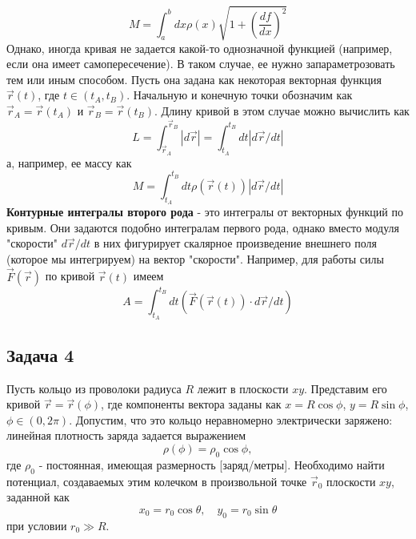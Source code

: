 \documentclass[a4paper,12pt]{article}
\begin{document}
\[
M	=\int_{a}^{b}dx\rho(x)\sqrt{1+\left(\frac{df}{dx}\right)^{2}}
\]
\bigskip
\noindent
Однако, иногда кривая не задается какой-то однозначной функцией (например, если она имеет самопересечение). В таком случае, ее нужно запараметрозовать тем или иным способом. Пусть она задана как некоторая векторная функция $\vec{r}(t)$,	где $t\in(t_{A},t_{B})$. Начальную и конечную точки обозначим как $\vec{r}_{A}=\vec{r}(t_{A})$ и $\vec{r}_{B}=\vec{r}(t_{B})$. Длину кривой в этом случае можно вычислить как
\[
L	=\int_{\vec{r}_{A}}^{\vec{r}_{B}}|d\vec{r}|=\int_{t_{A}}^{t_{B}}dt|d\vec{r}/dt|
\]
а, например, ее массу как
\[
M	=\int_{t_{A}}^{t_{B}}dt\rho(\vec{r}(t))|d\vec{r}/dt|
\]
\noindent
\textbf{Контурные интегралы второго рода} - это интегралы от векторных функций по кривым. Они задаются подобно интегралам первого рода, однако вместо модуля "скорости"  $d\vec{r}/dt$ в них фигурирует скалярное произведение внешнего поля (которое мы интегрируем) на вектор "скорости".  Например, для работы силы $\vec{F}(\vec{r})$ по кривой $\vec{r}(t)$ имеем
$$
A	=\int_{t_{A}}^{t_{B}}dt\left(\vec{F}(\vec{r}(t))\cdot d\vec{r}/dt\right)
$$
\subsection*{Задача 4}
Пусть кольцо из проволоки радиуса $R$ лежит в плоскости $xy$. Представим его кривой $\vec{r}=\vec{r}(\phi)$, где компоненты вектора заданы как
$x	=R\cos\phi$, $y=R\sin\phi$, $\phi\in(0,2\pi)$. Допустим, что это кольцо неравномерно электрически заряжено: линейная плотность заряда задается выражением
$$\rho(\phi)	=\rho_{0}\cos\phi,$$
где $\rho_{0}$ - постоянная, имеющая размерность [заряд/метры]. Необходимо найти потенциал, создаваемых этим колечком в произвольной точке $\vec{r}_{0}$ плоскости $xy$, заданной как
$$x_{0}	=r_{0}\cos\theta,\quad y_{0}=r_{0}\sin\theta$$
при условии $r_{0}\gg R$.
\end{document}

